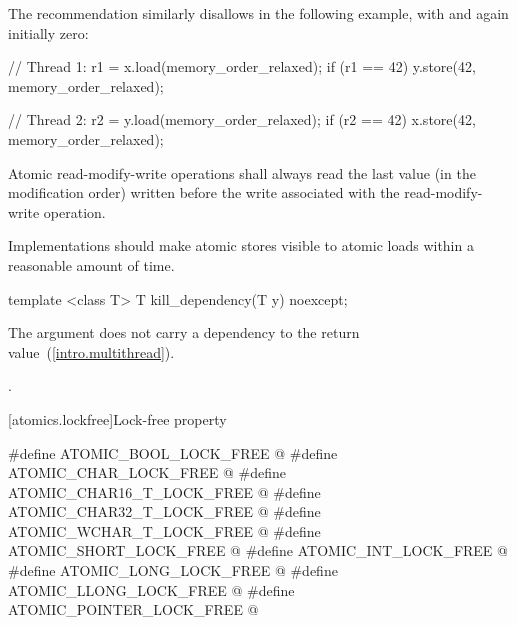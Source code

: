 \pnum
\begin{note} The recommendation similarly disallows  in the
following example, with  and  again initially zero:

\begin{codeblock}
// Thread 1:
r1 = x.load(memory_order_relaxed);
if (r1 == 42) y.store(42, memory_order_relaxed);
\end{codeblock}

\begin{codeblock}
// Thread 2:
r2 = y.load(memory_order_relaxed);
if (r2 == 42) x.store(42, memory_order_relaxed);
\end{codeblock}

\end{note}

\pnum
Atomic read-modify-write operations shall always read the last value
(in the modification order) written before the write associated with
the read-modify-write operation.

\pnum
Implementations should make atomic stores visible to atomic loads within a reasonable
amount of time.

%
\begin{itemdecl}
template <class T>
  T kill_dependency(T y) noexcept;
\end{itemdecl}

\begin{itemdescr}
\pnum
\effects The argument does not carry a dependency to the return
value~(\ref{intro.multithread}).

\pnum
\returns {}.
\end{itemdescr}


[atomics.lockfree]{Lock-free property}

%
%
%
%
%
%
%
%
%
%
\begin{codeblock}
#define ATOMIC_BOOL_LOCK_FREE @\unspec@
#define ATOMIC_CHAR_LOCK_FREE @\unspec@
#define ATOMIC_CHAR16_T_LOCK_FREE @\unspec@
#define ATOMIC_CHAR32_T_LOCK_FREE @\unspec@
#define ATOMIC_WCHAR_T_LOCK_FREE @\unspec@
#define ATOMIC_SHORT_LOCK_FREE @\unspec@
#define ATOMIC_INT_LOCK_FREE @\unspec@
#define ATOMIC_LONG_LOCK_FREE @\unspec@
#define ATOMIC_LLONG_LOCK_FREE @\unspec@
#define ATOMIC_POINTER_LOCK_FREE @\unspec@
\end{codeblock}

